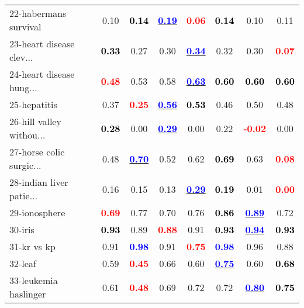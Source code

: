 \begin{table}[h]
\begin{center}
\begin{tabular}{lc|c|c|c|c|c|c}
22-habermans survival &   0.10 & \textcolor{black}{\textbf{  0.14}} & \underline{\textcolor{blue}{\textbf{  0.19}}} & \textcolor{red}{\textbf{  0.06}} & \textcolor{black}{\textbf{  0.14}} &   0.10 &   0.11 \\
23-heart disease clev... & \textcolor{black}{\textbf{  0.33}} &   0.27 &   0.30 & \underline{\textcolor{blue}{\textbf{  0.34}}} &   0.32 &   0.30 & \textcolor{red}{\textbf{  0.07}} \\
24-heart disease hung... & \textcolor{red}{\textbf{  0.48}} &   0.53 &   0.58 & \underline{\textcolor{blue}{\textbf{  0.63}}} & \textcolor{black}{\textbf{  0.60}} & \textcolor{black}{\textbf{  0.60}} & \textcolor{black}{\textbf{  0.60}} \\
25-hepatitis &   0.37 & \textcolor{red}{\textbf{  0.25}} & \underline{\textcolor{blue}{\textbf{  0.56}}} & \textcolor{black}{\textbf{  0.53}} &   0.46 &   0.50 &   0.48 \\ \hline
26-hill valley withou... & \textcolor{black}{\textbf{  0.28}} &   0.00 & \underline{\textcolor{blue}{\textbf{  0.29}}} &   0.00 &   0.22 & \textcolor{red}{\textbf{ -0.02}} &   0.00 \\
27-horse colic surgic... &   0.48 & \underline{\textcolor{blue}{\textbf{  0.70}}} &   0.52 &   0.62 & \textcolor{black}{\textbf{  0.69}} &   0.63 & \textcolor{red}{\textbf{  0.08}} \\
28-indian liver patie... &   0.16 &   0.15 &   0.13 & \underline{\textcolor{blue}{\textbf{  0.29}}} & \textcolor{black}{\textbf{  0.19}} &   0.01 & \textcolor{red}{\textbf{  0.00}} \\
29-ionosphere & \textcolor{red}{\textbf{  0.69}} &   0.77 &   0.70 &   0.76 & \textcolor{black}{\textbf{  0.86}} & \underline{\textcolor{blue}{\textbf{  0.89}}} &   0.72 \\
30-iris & \textcolor{black}{\textbf{  0.93}} &   0.89 & \textcolor{red}{\textbf{  0.88}} &   0.91 & \textcolor{black}{\textbf{  0.93}} & \underline{\textcolor{blue}{\textbf{  0.94}}} & \textcolor{black}{\textbf{  0.93}} \\ \hline
31-kr vs kp &   0.91 & \textcolor{blue}{\textbf{  0.98}} &   0.91 & \textcolor{red}{\textbf{  0.75}} & \textcolor{blue}{\textbf{  0.98}} &   0.96 &   0.88 \\
32-leaf &   0.59 & \textcolor{red}{\textbf{  0.45}} &   0.66 &   0.60 & \underline{\textcolor{blue}{\textbf{  0.75}}} &   0.60 & \textcolor{black}{\textbf{  0.68}} \\
33-leukemia haslinger &   0.61 & \textcolor{red}{\textbf{  0.48}} &   0.69 &   0.72 &   0.72 & \underline{\textcolor{blue}{\textbf{  0.80}}} & \textcolor{black}{\textbf{  0.75}} \\\end{tabular}\label{tab:balaccClassif0}
\end{center}
\end{table}
